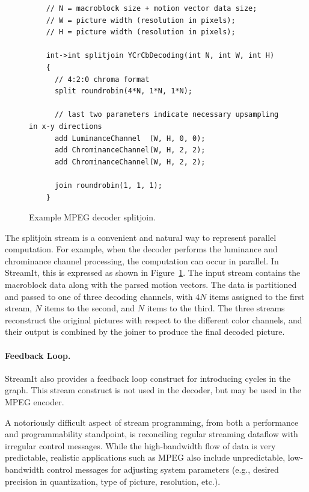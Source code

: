 \begin{figure}[t]
  \begin{scriptsize}
    \begin{verbatim}
	// N = macroblock size + motion vector data size;
	// W = picture width (resolution in pixels);
	// H = picture width (resolution in pixels);

	int->int splitjoin YCrCbDecoding(int N, int W, int H)
	{
	  // 4:2:0 chroma format
	  split roundrobin(4*N, 1*N, 1*N);

	  // last two parameters indicate necessary upsampling in x-y directions
	  add LuminanceChannel  (W, H, 0, 0);
	  add ChrominanceChannel(W, H, 2, 2);
	  add ChrominanceChannel(W, H, 2, 2);

	  join roundrobin(1, 1, 1);  
	}
    \end{verbatim}
  \end{scriptsize}
  \caption{Example MPEG decoder splitjoin.}
  \label{fig:decoder-sj}
\end{figure}

The splitjoin stream is a convenient and natural way to represent
parallel computation. For example, when the decoder performs the
luminance and chrominance channel processing, the computation can
occur in parallel. In StreamIt, this is expressed as shown in
Figure~\ref{fig:decoder-sj}. The input stream contains the
macroblock data along with the parsed motion vectors. The data is
partitioned and passed to one of three decoding channels, with $4N$
items assigned to the first stream, $N$ items to the second, and $N$
items to the third. The three streams reconstruct the original
pictures with respect to the different color channels, and their
output is combined by the joiner to produce the final decoded picture.

\paragraph{Feedback Loop.}
StreamIt also provides a feedback loop construct for introducing
cycles in the graph. This stream construct is not used in the decoder,
but may be used in the MPEG encoder.

\label{sec:messaging}
A notoriously difficult aspect of stream programming, from both a
performance and programmability standpoint, is reconciling regular
streaming dataflow with irregular control messages.  While the
high-bandwidth flow of data is very predictable, realistic
applications such as MPEG also include unpredictable, low-bandwidth
control messages for adjusting system parameters (e.g., desired
precision in quantization, type of picture, resolution, etc.).

